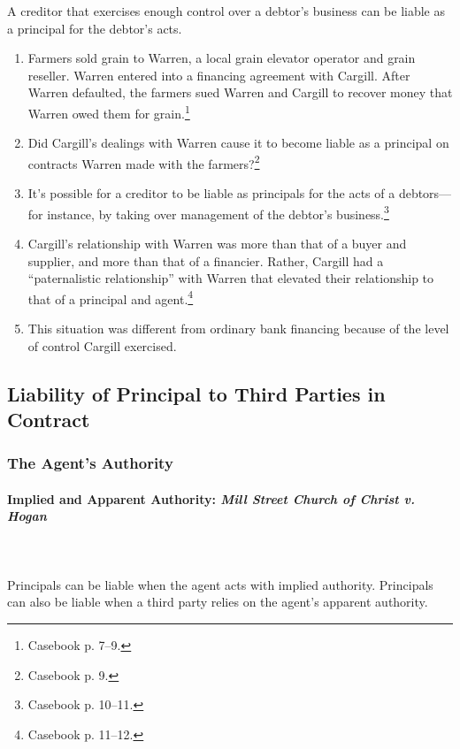 A creditor that exercises enough control over a debtor's business can be 
liable as a principal for the debtor's acts.

\begin{enumerate}
    \item Farmers sold grain to Warren, a local grain elevator operator and 
    grain reseller. Warren entered into a financing agreement with Cargill. 
    After Warren defaulted, the farmers sued Warren and Cargill to recover 
    money that Warren owed them for grain.\footnote{Casebook p. 7--9.}
    \item Did Cargill's dealings with Warren cause it to become liable as a 
    principal on contracts Warren made with the farmers?\footnote{Casebook p. 
    9.}
    \item It's possible for a creditor to be liable as principals for the acts 
    of a debtors---for instance, by taking over management of the debtor's 
    business.\footnote{Casebook p. 10--11.}
    \item Cargill's relationship with Warren was more than that of a buyer and 
    supplier, and more than that of a financier. Rather, Cargill had a 
    ``paternalistic relationship'' with Warren that elevated their 
    relationship to that of a principal and agent.\footnote{Casebook p. 
    11--12.}
    \item This situation was different from ordinary bank financing because of 
    the level of control Cargill exercised.
\end{enumerate}

\subsection{Liability of Principal to Third Parties in Contract}

\subsubsection{The Agent's Authority}

\paragraph{Implied and Apparent Authority: \emph{Mill Street Church of Christ 
v. Hogan}}
~\\\\
Principals can be liable when the agent acts with implied authority. 
Principals can also be liable when a third party relies on the agent's 
apparent authority.

